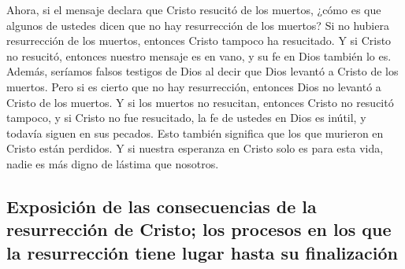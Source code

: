  Ahora, si el mensaje declara que Cristo resucitó de los
muertos, ¿cómo es que algunos de ustedes dicen que no hay resurrección
de los muertos?  Si no hubiera resurrección de los
muertos, entonces Cristo tampoco ha resucitado.  Y si
Cristo no resucitó, entonces nuestro mensaje es en vano, y su fe en Dios
también lo es.  Además, seríamos falsos testigos de Dios
al decir que Dios levantó a Cristo de los muertos. Pero si es cierto que
no hay resurrección, entonces Dios no levantó a Cristo de los muertos.
 Y si los muertos no resucitan, entonces Cristo no
resucitó tampoco,  y si Cristo no fue resucitado, la fe
de ustedes en Dios es inútil, y todavía siguen en sus pecados.
 Esto también significa que los que murieron en Cristo
están perdidos.  Y si nuestra esperanza en Cristo solo es
para esta vida, nadie es más digno de lástima que nosotros.

\hypertarget{exposiciuxf3n-de-las-consecuencias-de-la-resurrecciuxf3n-de-cristo-los-procesos-en-los-que-la-resurrecciuxf3n-tiene-lugar-hasta-su-finalizaciuxf3n}{%
\subsection{Exposición de las consecuencias de la resurrección de
Cristo; los procesos en los que la resurrección tiene lugar hasta su
finalización}\label{exposiciuxf3n-de-las-consecuencias-de-la-resurrecciuxf3n-de-cristo-los-procesos-en-los-que-la-resurrecciuxf3n-tiene-lugar-hasta-su-finalizaciuxf3n}}

